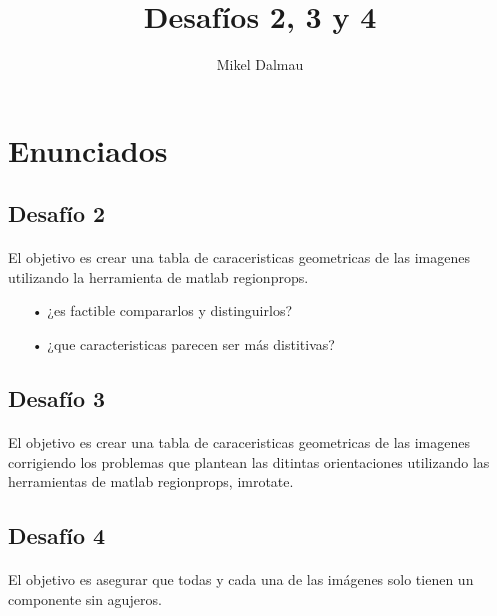 \documentclass[es,gi]{ifirak}\usepackage[]{graphicx}\usepackage[]{color}
\begin{document}
\title{Desafíos 2, 3 y 4}
\author{Mikel Dalmau}

\maketitle




\tableofcontents

\section{Enunciados}
\subsection{Desafío 2}
\paragraph{}
El objetivo es crear una tabla de caraceristicas geometricas de las imagenes utilizando la herramienta de matlab regionprops.

\begin{itemize}
\item[•] ¿es factible compararlos y distinguirlos?
\item[•] ¿que caracteristicas parecen ser más distitivas?
\end{itemize}

\subsection{Desafío 3}
\paragraph{}
El objetivo es crear una tabla de caraceristicas geometricas de las imagenes corrigiendo los problemas que plantean las ditintas orientaciones utilizando las herramientas de matlab regionprops, imrotate.

\subsection{Desafío 4}
\paragraph{}
El objetivo es asegurar que todas y cada una de las imágenes solo tienen un componente sin agujeros.
\end{document}
